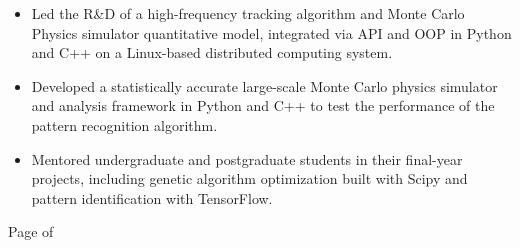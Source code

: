 \documentclass[oneside]{article}
\begin{document}
{\begin{minipage}[t][\dimexpr\textheight-2\fboxrule-2\fboxsep\relax][t]{\dimexpr0.6\textwidth-2\fboxrule-2\fboxsep\relax}
{\begin{itemize}
            \item Led the R\&D of a high-frequency tracking algorithm and Monte Carlo Physics simulator quantitative model, integrated via API and OOP in Python and C++ on a Linux-based distributed computing system. 

            \item Developed a statistically accurate large-scale Monte Carlo physics simulator and analysis framework in Python and C++ to test the performance of the pattern recognition algorithm.


            
            \item Mentored undergraduate and postgraduate students in their final-year projects, including genetic algorithm optimization built with Scipy and pattern identification with TensorFlow.
            

            
        \end{itemize}
        }
        \vfill%
        {\hfill\small{}\selectfont Page \thepage of \pageref{LastPage}\hfill}
    \end{minipage}
}
\end{document}

